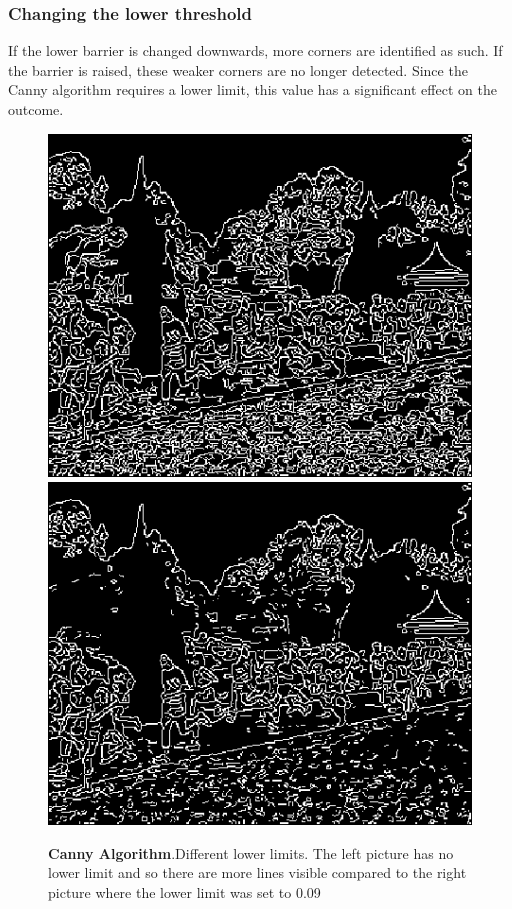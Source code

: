 \documentclass{article}
\begin{document}
	\subsubsection{Changing the lower threshold}If the lower barrier is changed downwards, more corners are identified as such. 
	If the barrier is raised, these weaker corners are no longer detected.
	Since the Canny algorithm requires a lower limit, this value has a significant effect on the outcome.
	\begin{figure}[!h]
		\center
		\caption{\textbf{Canny Algorithm}.Different lower limits. The left picture has no lower limit and so there are more lines visible compared to the right picture where the lower limit  was set to 0.09}
		\includegraphics[scale=0.5]{E_canny_tl0.png}
		\includegraphics[scale=0.5]{E_canny_tl09.png}
	\end{figure}
\end{document}
